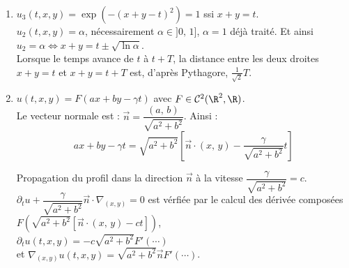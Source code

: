 \documentclass[12pt,a4paper]{article}
\begin{document}
\begin{sol}
\begin{enumerate}
	avec $F(z) = \exp(-2z^2)$\\
	
	\begin{minipage}[t]{20cm}
		$\partial_{tt}u_3 = \partial_t\left(-\norme{\vec c}F'\left(\vec n\cdot \begin{bmatrix}
		x\\ y
	\end{bmatrix}-\norme{\vec c}t\right)\right) = \norme{\vec c}^2F''\left(\vec n\cdot \begin{bmatrix}
	x\\ y
	\end{bmatrix}-\norme{\vec c}t\right)$.\\
	$\partial_{xx}u_3 = \frac12F''\left(\vec n\cdot \begin{bmatrix}
		x\\ y
	\end{bmatrix}-\norme{\vec c}t\right)$\\
	$\partial_{t} u_3 - \frac12 \Delta u_3 = 0 \iff \partial_{t} u_3 - \left(\frac1{\sqrt{2}}\Delta u_3\right) = 0$
	\end{minipage}
	\item $u_3(t,x,y) = \exp(-(x+y-t)^2) = 1$ ssi $x+y=t$.\\
	$u_2(t,x,y) = \alpha$, nécessairement $ \alpha \in ]0,\, 1]$, $\alpha = 1$ déjà traité. Et ainsi $u_2 = \alpha \iff x+y=t\pm \sqrt{\ln \alpha}$.\\
	Lorsque le temps avance de $t$ à $t+T$, la distance entre les deux droites $x+y=t$ et $x+y=t+T$ est, d'après Pythagore, $\frac1{\sqrt 2}T$.
	
	\item $u(t,x,y) = F(ax+by-\gamma t)$ avec $F \in \mathcal C^2(\R^2,\R)$.\\
	Le vecteur normale est : $\vec n = \dfrac{(a,\, b)}{\sqrt{a^2+b^2}}$. Ainsi :
	\[
		ax+by-\gamma t = \sqrt{a^2+b^2}\left[\vec n \cdot (x,\, y) - \dfrac{\gamma}{\sqrt{a^2+b^2}} t\right]
	\]
	
	\begin{minipage}[t]{16cm}
		Propagation du profil dans la direction $\vec n$ à la vitesse $\dfrac{\gamma}{\sqrt{a^2+b^2}} = c$.\\
	$\partial_t u + \dfrac{\gamma}{\sqrt{a^2 + b^2}}\vec n \cdot \nabla_{(x,y)} = 0$ est vérfiée par le calcul des dérivée composées $F\left(\sqrt{a^2+b^2}\left[\vec n \cdot (x,\, y)-ct\right]\right)$,\\ $\partial_t u(t,x,y) = -c\sqrt{a^2+b^2}F'(\cdots)$\\ et $\nabla_{(x,y)} u(t,x,y) = \sqrt{a^2+b^2}\vec n F'(\cdots)$.
	\end{minipage}
	

\end{enumerate}
\end{sol}
\end{document}
